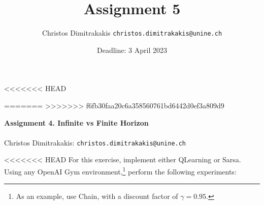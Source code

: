 \documentclass[twoside,a4paper]{article}
\begin{document}
<<<<<<< HEAD
\title{Assignment 5}
\author{Christos Dimitrakakis  \texttt{christos.dimitrakakis@unine.ch}}
\date{Deadline: 3 April 2023}
\maketitle
=======
>>>>>>> f6fb30faa20c6a358560761bd6442d0ef3a809d9

\Large{\bf Assignment 4. Infinite vs Finite Horizon}
\vspace{1em}
\\
\vspace{1em}
\\
\large{Christos Dimitrakakis:} \texttt{christos.dimitrakakis@unine.ch}

<<<<<<< HEAD
For this exercise, implement either QLearning or Sarsa. Using any OpenAI Gym environment,\footnote{As an example, use Chain, with a discount factor of $\gamma = 0.95$.} perform the following experiments:
\end{document}
